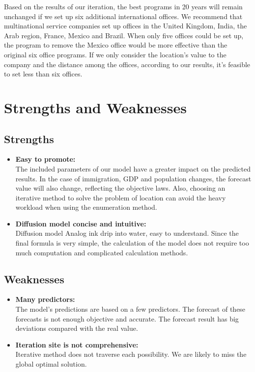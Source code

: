 \documentclass{mcmthesis}
\begin{document}
  Based on the results of our iteration,
  the best programs in 20 years will remain unchanged
  if we set up six additional international offices.
  We recommend that multinational service companies
  set up offices in the United Kingdom, India, the Arab region, France, Mexico and Brazil.
  When only five offices could be set up,
  the program to remove the Mexico office would be more effective than the original six office programs.
  If we only consider the location's
  value to the company and the distance among the offices, according to our results, it's feasible to set less than six offices.

  \section{Strengths and Weaknesses}
  \subsection{Strengths}
  \begin{itemize}
    \item\textbf{Easy to promote:} \\
    The included parameters of our model have a greater impact on the predicted results. In the case of immigration,
    GDP and population changes, the forecast value will also change, reflecting the objective laws.
    Also, choosing an iterative method to solve the problem of location can avoid the heavy workload when using the enumeration method.
    \item\textbf{Diffusion model concise and intuitive:} \\
    Diffusion model Analog ink drip into water, easy to understand.
    Since the final formula is very simple,
    the calculation of the model does not require too much computation and complicated calculation methods.
  \end{itemize}
  \subsection{Weaknesses}
  \begin{itemize}
    \item\textbf{Many predictors:} \\
    The model's predictions are based on a few predictors.
    The forecast of these forecasts is not enough objective and accurate.
    The forecast result has big deviations compared with the real value.
    \item\textbf{Iteration site is not comprehensive:}\\
    Iterative method does not traverse each possibility.
    We are likely to miss the global optimal solution.
  \end{itemize}
\end{document}
